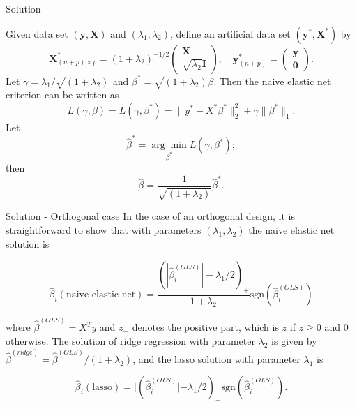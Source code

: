     \begin{frame}{Solution}
        \begin{lemma}[1]
            Given data set $\left(\textbf{y}, \textbf{X}\right)$ and $(\lambda_1, \lambda_2)$, define an artificial data set $\left(\textbf{y}^*, \textbf{X}^*\right)$ by
$$
\mathbf{X}^*_{(n+p) \times p} = (1 + \lambda_2)^{-1/2}
\begin{pmatrix}
\mathbf{X} \\
\sqrt{\lambda_2} \mathbf{I}
\end{pmatrix}, \quad
\mathbf{y}^*_{(n+p)} = \begin{pmatrix}
\mathbf{y} \\
\mathbf{0}
\end{pmatrix}.
$$
Let $\gamma=\lambda_1/\sqrt{(1+\lambda_2)}$ and $\beta^*=\sqrt{(1+\lambda_2)}\beta$. Then the naive elastic net criterion can be written as
$$
L(\gamma, \beta) = L(\gamma, \beta^*) = \lVert y^* - X^* \beta^* \rVert_2^2 + \gamma \lVert \beta^* \rVert_1.
$$
Let
$$
\hat{\beta}^* = \underset{\beta^*}{\arg\min} L\left(\gamma, \beta^*\right);
$$
then
$$
\hat{\beta} = \frac{1}{\sqrt{(1 + \lambda_2)}} \hat{\beta}^*.
$$
        \end{lemma}
    \end{frame}

\begin{frame}{Solution - Orthogonal case}
    In the case of an orthogonal design, it is straightforward to show that with parameters $(\lambda_1, \lambda_2)$ the naive elastic net solution is

\begin{equation}
  \hat{\beta}_i (\text{naive elastic net}) = \frac{(|\hat{\beta}_i^{(OLS)}| - \lambda_1 / 2)_+}{1 + \lambda_2} \text{sgn}(\hat{\beta}_i^{(OLS)}) 
\end{equation}


where $\hat{\beta}^{(OLS)} = X^T y$ and $z_+$ denotes the positive part, which is $z$ if $z \geq 0$ and $0$ otherwise. The solution of ridge regression with parameter $\lambda_2$ is given by $\hat{\beta}^{(ridge)} = \hat{\beta}^{(OLS)} / (1 + \lambda_2)$, and the lasso solution with parameter $\lambda_1$ is

$$
\hat{\beta}_i (\text{lasso}) = |(\hat{\beta}_i^{(OLS)}| - \lambda_1 / 2)_+ \text{sgn}(\hat{\beta}_i^{(OLS)}).
$$

\end{frame}

